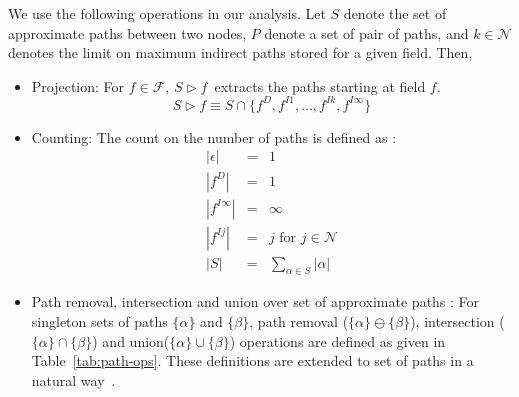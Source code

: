 \documentclass[letterpaper]{sig-alternate}
\newcommand{\is}{\itemsep -1mm} %
\newcommand{\drct}{\ensuremath{D}}
\newcommand{\indrct}{\ensuremath{I}}
\newcommand{\fields}{\ensuremath{\mathcal{F}}}
\newcommand{\nat}{\ensuremath{\mathcal{N}}}
\newcommand{\project}[2]{\ensuremath{#1\triangleright\!\!#2}}
\newcommand{\num}[1]{\ensuremath{|#1|}}
\newcommand{\remOne}[2]{\ensuremath{#1 \ominus #2}}
\begin{document}
We use the following operations in our analysis. Let $S$
denote the set of approximate paths between two nodes, $P$
denote a set of pair of paths, and $k \in \nat$ denotes the
limit on maximum indirect paths stored for a given
field. Then,
\begin{itemize}\is
\item Projection: For $f \in \fields$,
  \project{S}{f}\ extracts the paths starting at field $f$.
  $$\project{S}{f} \equiv S \cap \{f^{\drct}, f^{\indrct 1}, \ldots,
  f^{\indrct k}, f^{\indrct \infty}\}$$

\item Counting: The count on the number of paths is defined
  as :
  \begin{eqnarray*}
   \num{\epsilon} &=&     1 \\ %
   \num{f^{\drct}} &=&     1 \\
   \num{f^{\indrct\infty}} &=&     \infty \\
   \num{f^{\indrct j}} &=&  j \mbox{ for } j \in \nat  \\
   \num{S} &=&   \sum_{\alpha \in S}\num{\alpha}
  \end{eqnarray*}
\item Path removal, intersection and union over set of
  approximate paths : For singleton sets of paths
    $\{\alpha\}$ and $\{\beta\}$, path removal
    (\remOne{\{\alpha\}}{\{\beta\}}), intersection
    ($\{\alpha\} \cap \{\beta\}$) and union($\{\alpha\} \cup
    \{\beta\}$) operations are defined as given in
    Table~\ref{tab:path-ops}. These definitions are extended
    to set of paths in a natural way~\cite{Sandeep11thesis}.\\


\end{itemize}
\end{document}
